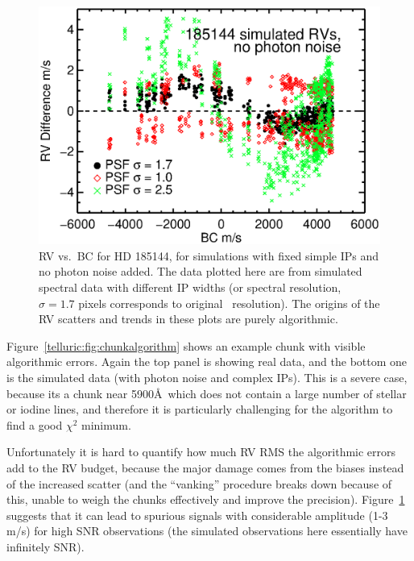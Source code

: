 \begin{figure}
\centering
\includegraphics[scale=0.65]{telluric/185144-rv-bc-rja01-rje01-rjf01.eps} 
\caption{RV vs.\ BC for HD 185144, for simulations with fixed simple
IPs and no photon noise added. The data plotted here are from
simulated spectral data with different IP widths (or spectral
resolution, $\sigma=1.7$ pixels corresponds to original \keck\
resolution). The origins of the RV scatters and trends in these plots
are purely algorithmic.
\label{keck:fig:algorithm}}
\end{figure}

Figure~\ref{telluric:fig:chunkalgorithm} shows an example chunk with
visible algorithmic errors. Again the top panel is showing real data,
and the bottom one is the simulated data (with photon noise and
complex IPs). This is a severe case, because its a chunk near 5900\AA\
which does not contain a large number of stellar or iodine lines, and
therefore it is particularly challenging for the algorithm to find a
good $\chi^2$ minimum.

Unfortunately it is hard to quantify how much RV RMS the algorithmic
errors add to the RV budget, because the major damage comes from the
biases instead of the increased scatter (and the ``vanking'' procedure
breaks down because of this, unable to weigh the chunks effectively
and improve the precision). Figure~\ref{keck:fig:algorithm} suggests
that it can lead to spurious signals with considerable amplitude (1-3
m/s) for high SNR observations (the simulated observations here
essentially have infinitely SNR).


